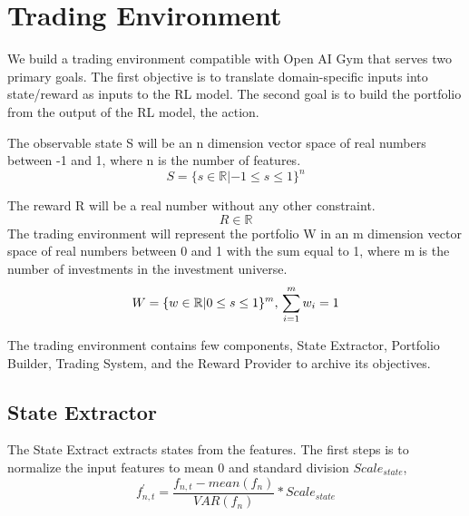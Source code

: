 \section{Trading Environment}
We build a trading environment compatible with Open AI Gym \cite{brockman2016openai} that serves two primary goals. The first objective is to translate domain-specific inputs into state/reward as inputs to the RL model. The second goal is to build the portfolio from the output of the RL model, the action.

\par
The observable state S will be an n dimension vector space of real numbers between -1 and 1, where n is the number of features.
\[
    S = \{ {s \in \mathbb{R} | -1 \leq s \leq 1 } \} ^n
\]

\par
The reward R will be a real number without any other constraint.
\[
    R \in \mathbb{R}
\]
The trading environment will represent the portfolio W in an m dimension vector space of real numbers between 0 and 1 with the sum equal to 1, where m is the number of investments in the investment universe.
\[
    W = \{ {w \in \mathbb{R} | 0 \leq s \leq 1 } \} ^m,
    \\
    \sum_{i=1}^m {w_i} =1
\]
\par
The trading environment contains few components, State Extractor, Portfolio Builder, Trading System, and the Reward Provider to archive its objectives.

\subsection {State Extractor}
The State Extract extracts states from the features. 
The first steps is to normalize the input features to mean 0 and standard division \(Scale_{state}\),
\[
    f^{'}_{n,t} = \frac{f_{n,t} -  mean(f_n)}{VAR(f_n)}*Scale_{state} 
\]

